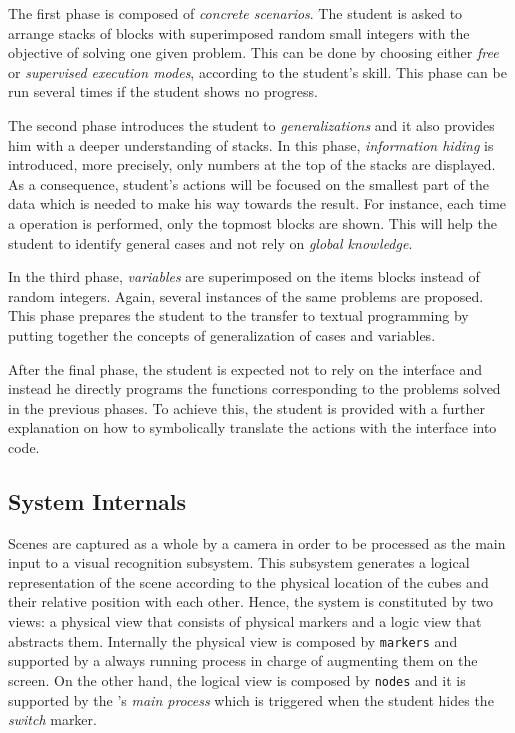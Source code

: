 The first phase is composed of \emph{concrete scenarios}. The student
is asked to arrange stacks of blocks with superimposed random small
integers with the objective of solving one given problem. This can be
done by choosing either \emph{free} or \emph{supervised execution
  modes}, according to the student's skill. This phase can be run
several times if the student shows no progress.

The second phase introduces the student to \emph{generalizations} and
it also provides him with a deeper understanding of stacks. In this
phase, \emph{information hiding} is introduced, more precisely, only
numbers at the top of the stacks are displayed. As a consequence,
student's actions will be focused on the smallest part of the data
which is needed to make his way towards the result. For instance, each
time a \poppush operation is performed, only the topmost blocks are
shown. This will help the student to identify general cases and not
rely on \emph{global knowledge}.

In the third phase, \emph{variables} are superimposed on the items
blocks instead of random integers. Again, several instances of the
same problems are proposed. This phase prepares the student to the
transfer to textual programming by putting together the concepts of
generalization of cases and variables.

After the final phase, the student is expected not to rely on the
interface and instead he directly programs the \erlang functions
corresponding to the problems solved in the previous phases. To
achieve this, the student is provided with a further explanation on
how to symbolically translate the actions with the interface into
\erlang code.

\subsection{System Internals}

Scenes are captured as a whole by a camera in order to be processed as
the main input to a visual recognition subsystem. This subsystem
generates a logical representation of the scene according to the
physical location of the cubes and their relative position with each
other. Hence, the system is constituted by two views: a physical view
that consists of physical markers and a logic view that abstracts
them. Internally the physical view is composed by \texttt{markers} and
supported by a always running process in charge of augmenting them on
the screen. On the other hand, the logical view is composed by
\texttt{nodes} and it is supported by the \vestige's
\emph{main process} which is triggered when the student hides the
\emph{switch} marker.

